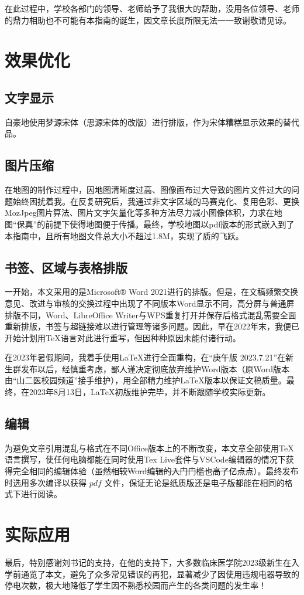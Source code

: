 在此过程中，学校各部门的领导、老师给予了我很大的帮助，没用各位领导、老师的鼎力相助也不可能有本指南的诞生，因文章长度所限无法一一致谢敬请见谅。

\section[效果优化]{效果优化}
\subsection[文字显示]{文字显示}
自豪地使用梦源宋体（思源宋体的改版）进行排版，作为宋体糟糕显示效果的替代品。

\subsection[图片压缩]{图片压缩}
在地图的制作过程中，因地图清晰度过高、图像画布过大导致的图片文件过大\footnotemark 的问题始终困扰着我。在反复研究后，我通过非文字区域的马赛克化、复用色彩、更换MozJpeg图片算法、图片文字矢量化等多种方法尽力减小图像体积，力求在地图“保真”的前提下使得地图便于传播。最终，学校地图以pdf版本的形式嵌入到了本指南中，且所有地图文件总大小不超过1.8M，实现了质的飞跃。

\subsection[书签、区域与表格排版]{书签、区域与表格排版}
一开始，本文采用的是Microsoft® Word 2021进行的排版。但是，在文稿频繁交换意见、改进与审核的交换过程中出现了不同版本Word显示不同，高分屏与普通屏排版不同，Word、LibreOffice Writer与WPS重复打开并保存后格式混乱需要全面重新排版，书签与超链接难以进行管理等诸多问题。因此，早在2022年末，我便已开始计划用TeX语言对此进行重写，但因种种原因未能付诸行动。

在2023年暑假期间，我着手使用LaTeX进行全面重构，在“庚午版 2023.7.21”在新生群发布以后，经慎重考虑，鄙人谨决定彻底放弃维护Word版本（原Word版本由“山二医校园频道”接手维护），用全部精力维护LaTeX版本以保证文稿质量。最终，在2023年8月13日，LaTeX初版维护完毕，并不断跟随学校实际更新。

\subsection[编辑]{编辑}
为避免文章引用混乱与格式在不同Office版本上的不断改变，本文章全部使用\TeX 语言撰写，使任何电脑都能在同时使用Tex Live套件与VSCode编辑器\footnotemark 的情况下获得完全相同的编辑体验（\sout{虽然相较Word编辑的入门门槛也高了亿点点}）。最终发布时选用\XeLaTeX 多次编译以获得 $pdf$ 文件，保证无论是纸质版还是电子版都能在相同的格式下进行阅读。

\section[实际应用]{实际应用}
最后，特别感谢刘书记的支持，在他的支持下，大多数临床医学院2023级新生在入学前通览了本文，避免了众多常见错误的再犯，显著减少了因使用违规电器导致的停电次数，极大地降低了学生因不熟悉校园而产生的各类问题的发生率！
